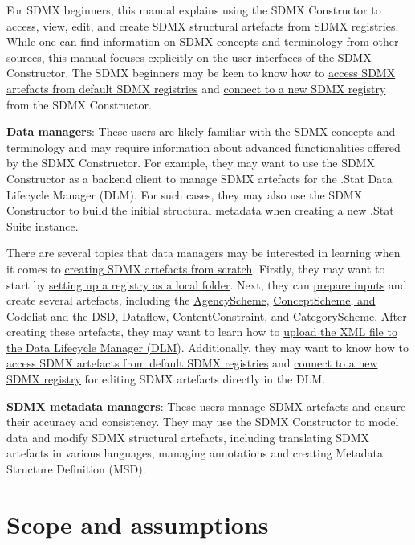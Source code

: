 \documentclass[
]{book}
\theoremstyle{definition}
\theoremstyle{definition}
\theoremstyle{definition}
\theoremstyle{definition}
\theoremstyle{remark}
\begin{document}
For SDMX beginners, this manual explains using the SDMX Constructor to access, view, edit, and create SDMX structural artefacts from SDMX registries. While one can find information on SDMX concepts and terminology from other sources, this manual focuses explicitly on the user interfaces of the SDMX Constructor. The SDMX beginners may be keen to know how to \protect\hyperlink{accessing-sdmx}{access SDMX artefacts from default SDMX registries} and \protect\hyperlink{connect-to}{connect to a new SDMX registry} from the SDMX Constructor.

\textbf{Data managers}: These users are likely familiar with the SDMX concepts and terminology and may require information about advanced functionalities offered by the SDMX Constructor. For example, they may want to use the SDMX Constructor as a backend client to manage SDMX artefacts for the .Stat Data Lifecycle Manager (DLM). For such cases, they may also use the SDMX Constructor to build the initial structural metadata when creating a new .Stat Suite instance.

There are several topics that data managers may be interested in learning when it comes to \protect\hyperlink{creating-sdmx}{creating SDMX artefacts from scratch}. Firstly, they may want to start by \protect\hyperlink{setting-up}{setting up a registry as a local folder}. Next, they can \protect\hyperlink{preparing-inputs}{prepare inputs} and create several artefacts, including the \protect\hyperlink{creating-agencyschme}{AgencyScheme}, \protect\hyperlink{creating-conceptscheme}{ConceptScheme, and Codelist} and the \protect\hyperlink{creating-dsd}{DSD, Dataflow, ContentConstraint, and CategoryScheme}. After creating these artefacts, they may want to learn how to \protect\hyperlink{upload-the}{upload the XML file to the Data Lifecycle Manager (DLM)}. Additionally, they may want to know how to \protect\hyperlink{access-sdmx}{access SDMX artefacts from default SDMX registries} and \protect\hyperlink{connect-to}{connect to a new SDMX registry} for editing SDMX artefacts directly in the DLM.

\textbf{SDMX metadata managers}: These users manage SDMX artefacts and ensure their accuracy and consistency. They may use the SDMX Constructor to model data and modify SDMX structural artefacts, including translating SDMX artefacts in various languages, managing annotations and creating Metadata Structure Definition (MSD).

\hypertarget{scope-and-assumptions}{%
\section*{Scope and assumptions}\label{scope-and-assumptions}}
\end{document}
